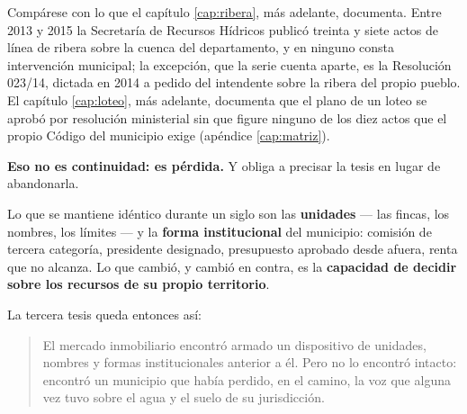 Compárese con lo que el capítulo \ref{cap:ribera}, más adelante, documenta. Entre 2013 y 2015 la Secretaría de Recursos
Hídricos publicó treinta y siete actos de línea de ribera sobre la cuenca del departamento, y en ninguno consta intervención municipal; la excepción, que la serie cuenta aparte, es la Resolución 023/14, dictada en 2014 a pedido del intendente sobre la ribera del propio pueblo. El capítulo \ref{cap:loteo}, más adelante, documenta que el plano de un loteo se
aprobó por resolución ministerial sin que figure ninguno de los diez actos que el
propio Código del municipio exige (apéndice \ref{cap:matriz}).

\textbf{Eso no es continuidad: es pérdida.} Y obliga a precisar la tesis en lugar de
abandonarla.

Lo que se mantiene idéntico durante un siglo son las \textbf{unidades} --- las fincas, los
nombres, los límites --- y la \textbf{forma institucional} del municipio: comisión de tercera
categoría, presidente designado, presupuesto aprobado desde afuera, renta que no alcanza. Lo
que cambió, y cambió en contra, es la \textbf{capacidad de decidir sobre los recursos de su
propio territorio}.

La tercera tesis queda entonces así:

\begin{quote}
El mercado inmobiliario encontró armado un dispositivo de unidades, nombres y formas
institucionales anterior a él. Pero no lo encontró intacto: encontró un municipio que había
perdido, en el camino, la voz que alguna vez tuvo sobre el agua y el suelo de su
jurisdicción.
\end{quote}

